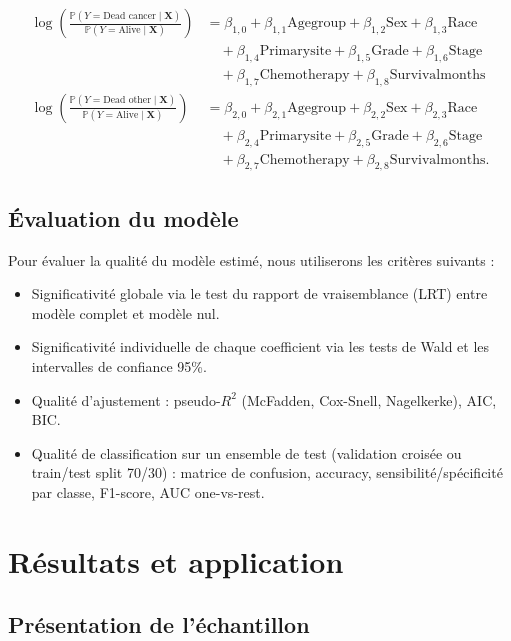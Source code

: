 \documentclass[12pt,a4paper]{article}
\begin{document}
\begin{align*}
\log\left(\frac{\mathbb{P}(Y=\text{Dead cancer} \mid \mathbf{X})}{\mathbb{P}(Y=\text{Alive} \mid \mathbf{X})}\right) &= \beta_{1,0} + \beta_{1,1} \text{Agegroup} + \beta_{1,2} \text{Sex} + \beta_{1,3} \text{Race} \\
&\quad + \beta_{1,4} \text{Primarysite} + \beta_{1,5} \text{Grade} + \beta_{1,6} \text{Stage} \\
&\quad + \beta_{1,7} \text{Chemotherapy} + \beta_{1,8} \text{Survivalmonths} \\
\log\left(\frac{\mathbb{P}(Y=\text{Dead other} \mid \mathbf{X})}{\mathbb{P}(Y=\text{Alive} \mid \mathbf{X})}\right) &= \beta_{2,0} + \beta_{2,1} \text{Agegroup} + \beta_{2,2} \text{Sex} + \beta_{2,3} \text{Race} \\
&\quad + \beta_{2,4} \text{Primarysite} + \beta_{2,5} \text{Grade} + \beta_{2,6} \text{Stage} \\
&\quad + \beta_{2,7} \text{Chemotherapy} + \beta_{2,8} \text{Survivalmonths}.
\end{align*}

\subsection{Évaluation du modèle}

Pour évaluer la qualité du modèle estimé, nous utiliserons les critères suivants :

\begin{itemize}
    \item Significativité globale via le test du rapport de vraisemblance (LRT) entre modèle complet et modèle nul.
    \item Significativité individuelle de chaque coefficient via les tests de Wald et les intervalles de confiance 95\%.
    \item Qualité d'ajustement : pseudo-$R^2$ (McFadden, Cox-Snell, Nagelkerke), AIC, BIC.
    \item Qualité de classification sur un ensemble de test (validation croisée ou train/test split 70/30) : matrice de confusion, accuracy, sensibilité/spécificité par classe, F1-score, AUC one-vs-rest.
\end{itemize}

\section{Résultats et application}

\subsection{Présentation de l'échantillon}
\end{document}
